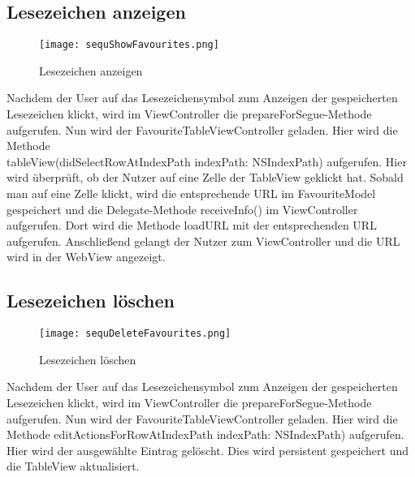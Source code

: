 \subsection{Lesezeichen anzeigen}
\begin{figure}[h]
	\centering
	\texttt{[image: sequShowFavourites.png]}
	\caption{Lesezeichen anzeigen}
	\label{fig:Lesezeichen anzeigen}
\end{figure}
Nachdem der User auf das Lesezeichensymbol zum Anzeigen der gespeicherten Lesezeichen klickt, wird im ViewController die prepareForSegue-Methode aufgerufen. Nun wird der FavouriteTableViewController geladen. Hier wird die Methode\\tableView(didSelectRowAtIndexPath indexPath: NSIndexPath) aufgerufen. Hier wird überprüft, ob der Nutzer auf eine Zelle der TableView geklickt hat. Sobald man auf eine Zelle klickt, wird die entsprechende URL im FavouriteModel gespeichert und die Delegate-Methode receiveInfo() im ViewController aufgerufen. Dort wird die Methode loadURL mit der entsprechenden URL aufgerufen. Anschließend gelangt der Nutzer zum ViewController und die URL wird in der WebView angezeigt.


\subsection{Lesezeichen löschen}
\begin{figure}[h]
	\centering
	\texttt{[image: sequDeleteFavourites.png]}
	\caption{Lesezeichen löschen}
	\label{fig:Lesezeichen loeschen}
\end{figure}
Nachdem der User auf das Lesezeichensymbol zum Anzeigen der gespeicherten Lesezeichen klickt, wird im ViewController die prepareForSegue-Methode aufgerufen. Nun wird der FavouriteTableViewController geladen. Hier wird die Methode editActionsForRowAtIndexPath indexPath: NSIndexPath) aufgerufen. Hier wird der ausgewählte Eintrag gelöscht. Dies wird persistent gespeichert und die TableView aktualisiert.

